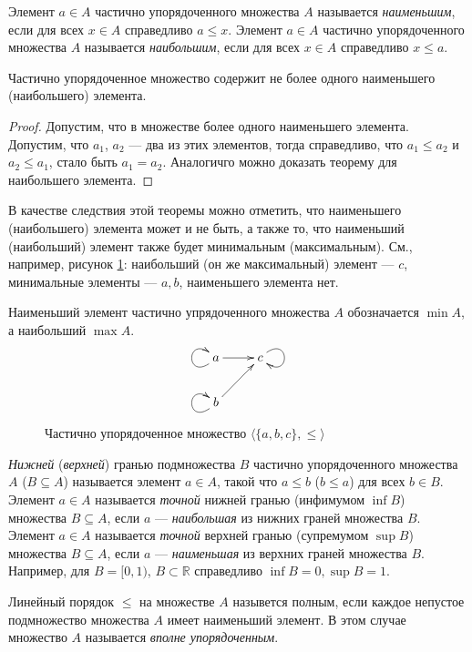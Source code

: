 Элемент $a\in A$ частично упорядоченного множества $A$ называется \emph{наименьшим}, если для всех $x\in A$ справедливо $a\leq x$. Элемент $a\in A$ частично упорядоченного множества $A$ называется \emph{наибольшим}, если для всех $x\in A$ справедливо $x\leq a$. 
\begin{Theor}
    Частично упорядоченное множество содержит не более одного наименьшего (наибольшего) элемента.
\end{Theor}
\begin{proof}    
    Допустим, что в множестве более одного наименьшего элемента. Допустим, что $a_1$, $a_2$ --- два из этих элементов, тогда справедливо, что $a_1\leq a_2$ и $a_2\leq a_1$, стало быть $a_1=a_2$. Аналогичго можно доказать теорему для наибольшего элемента.
\end{proof}

В качестве следствия этой теоремы можно отметить, что наименьшего (наибольшего) элемента может и не быть, а также то, что наименьший (наибольший) элемент также будет минимальным (максимальным). См., например, рисунок \ref{fig:bo:minMaxEx}: наибольший (он же максимальный) элемент --- $c$, минимальные элементы --- $a,b$, наименьшего элемента нет.

Наименьший элемент частично упрядоченного множества $A$ обозначается $\min{A}$, а наибольший $\max{A}$.
\begin{figure}
    \centering
    \[
    {\xymatrix{
        a \ar@{->}@(dl,ul)[] \ar@{->}[r]
            &c \ar@{->}@(ur,dr)[]
                \\
        b  \ar@{->}@(dl,ul)[] \ar@{->}[ur]
            &*{}                 
    }}
    \]
    \caption{Частично упорядоченное множество $\langle\{a,b,c\},\leq\rangle$}
    \label{fig:bo:minMaxEx}
\end{figure}    

\emph{Нижней} (\emph{верхней}) гранью подмножества $B$ частично упорядоченного множества $A$ ($B\subseteq A$) называется элемент $a\in A$, такой что $a\leq b$ ($b\leq a$) для всех $b\in B$. Элемент $a\in A$ называется \emph{точной} нижней гранью (инфимумом $\inf{B}$) множества $B\subseteq A$, если $a$ --- \emph{наибольшая} из нижних граней множества $B$. Элемент $a\in A$ называется \emph{точной} верхней гранью (супремумом $\sup{B}$) множества $B\subseteq A$, если $a$ --- \emph{наименьшая} из верхних граней множества $B$. Например, для $B=[0,1)$, $B\subset\mathbb{R}$ справедливо $\inf{B}=0,\sup{B}=1$.

Линейный порядок $\leq$ на множестве $A$ назывется полным, если каждое непустое подмножество множества $A$ имеет наименьший элемент. В этом случае множество $A$ называется \emph{вполне упорядоченным}.

